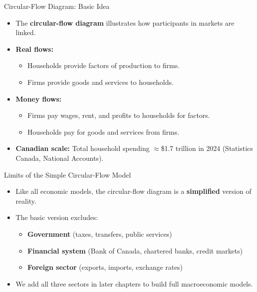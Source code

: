 \documentclass[aspectratio=169]{beamer}
\begin{document}
\begin{frame}{Circular-Flow Diagram: Basic Idea}
\transfade
\begin{itemize}
  \item The \textbf{circular-flow diagram} illustrates how participants in markets are linked.
  \item \textbf{Real flows:}
  \begin{itemize}
    \item Households provide factors of production to firms.
    \item Firms provide goods and services to households.
  \end{itemize}
  \item \textbf{Money flows:}
  \begin{itemize}
    \item Firms pay wages, rent, and profits to households for factors.
    \item Households pay for goods and services from firms.
  \end{itemize}
  \item \textbf{Canadian scale:} Total household spending $\approx$\$1.7 trillion in 2024 (Statistics Canada, National Accounts).
\end{itemize}
\end{frame}

\begin{frame}{Limits of the Simple Circular-Flow Model}
\transfade
\begin{itemize}
  \item Like all economic models, the circular-flow diagram is a \textbf{simplified} version of reality.
  \item The basic version excludes:
  \begin{itemize}
    \item \textbf{Government} (taxes, transfers, public services)
    \item \textbf{Financial system} (Bank of Canada, chartered banks, credit markets)
    \item \textbf{Foreign sector} (exports, imports, exchange rates)
  \end{itemize}
  \item We add all three sectors in later chapters to build full macroeconomic models.
\end{itemize}
\end{frame}
\end{document}
